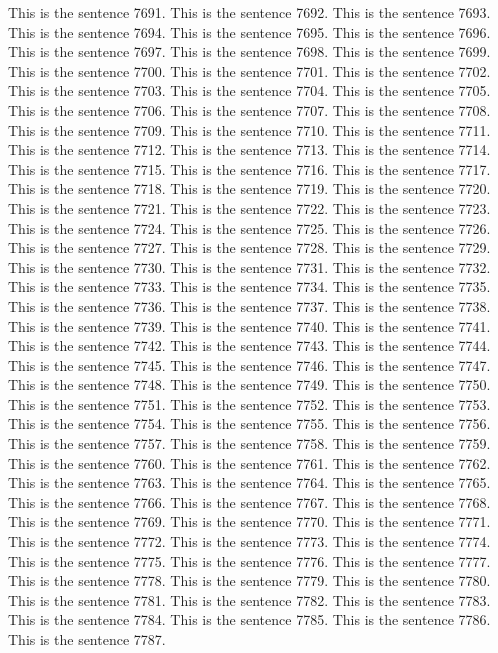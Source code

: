 \documentclass{article}
\begin{document}
This is the sentence 7691.
This is the sentence 7692.
This is the sentence 7693.
This is the sentence 7694.
This is the sentence 7695.
This is the sentence 7696.
This is the sentence 7697.
This is the sentence 7698.
This is the sentence 7699.
This is the sentence 7700.
This is the sentence 7701.
This is the sentence 7702.
This is the sentence 7703.
This is the sentence 7704.
This is the sentence 7705.
This is the sentence 7706.
This is the sentence 7707.
This is the sentence 7708.
This is the sentence 7709.
This is the sentence 7710.
This is the sentence 7711.
This is the sentence 7712.
This is the sentence 7713.
This is the sentence 7714.
This is the sentence 7715.
This is the sentence 7716.
This is the sentence 7717.
This is the sentence 7718.
This is the sentence 7719.
This is the sentence 7720.
This is the sentence 7721.
This is the sentence 7722.
This is the sentence 7723.
This is the sentence 7724.
This is the sentence 7725.
This is the sentence 7726.
This is the sentence 7727.
This is the sentence 7728.
This is the sentence 7729.
This is the sentence 7730.
This is the sentence 7731.
This is the sentence 7732.
This is the sentence 7733.
This is the sentence 7734.
This is the sentence 7735.
This is the sentence 7736.
This is the sentence 7737.
This is the sentence 7738.
This is the sentence 7739.
This is the sentence 7740.
This is the sentence 7741.
This is the sentence 7742.
This is the sentence 7743.
This is the sentence 7744.
This is the sentence 7745.
This is the sentence 7746.
This is the sentence 7747.
This is the sentence 7748.
This is the sentence 7749.
This is the sentence 7750.
This is the sentence 7751.
This is the sentence 7752.
This is the sentence 7753.
This is the sentence 7754.
This is the sentence 7755.
This is the sentence 7756.
This is the sentence 7757.
This is the sentence 7758.
This is the sentence 7759.
This is the sentence 7760.
This is the sentence 7761.
This is the sentence 7762.
This is the sentence 7763.
This is the sentence 7764.
This is the sentence 7765.
This is the sentence 7766.
This is the sentence 7767.
This is the sentence 7768.
This is the sentence 7769.
This is the sentence 7770.
This is the sentence 7771.
This is the sentence 7772.
This is the sentence 7773.
This is the sentence 7774.
This is the sentence 7775.
This is the sentence 7776.
This is the sentence 7777.
This is the sentence 7778.
This is the sentence 7779.
This is the sentence 7780.
This is the sentence 7781.
This is the sentence 7782.
This is the sentence 7783.
This is the sentence 7784.
This is the sentence 7785.
This is the sentence 7786.
This is the sentence 7787.
\end{document}
